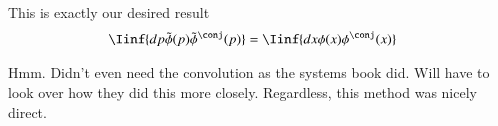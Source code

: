 This is exactly our desired result
\begin{align*}
\Iinf{ dp \tilde{\phi}(p){\tilde{\phi}}^\conj(p) } &= 
\Iinf{ dx \phi(x) \phi^\conj(x)}
\end{align*}

Hmm.  Didn't even need the convolution as the systems book did.  Will have to look over how they did this more closely.  Regardless, this method was nicely direct.
